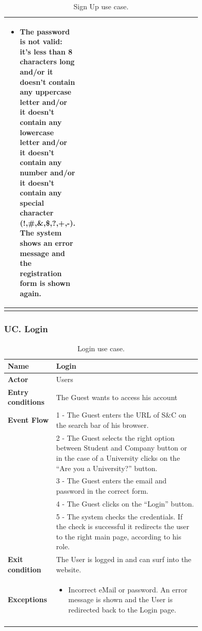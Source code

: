\begin{center}
\begin{longtable}{|l|p{0.75\linewidth}|}
\begin{itemize}
            \item The password is not valid: it’s less than 8 characters long and/or it doesn’t contain any uppercase letter and/or it doesn’t contain any lowercase letter and/or it doesn’t contain any number and/or it doesn’t contain any special character (!,\#,\&,\$,?,+,-). The system shows an error message and the registration form is shown again.
        \end{itemize}\\
        \hline
        \caption{Sign Up use case.}
        \label{tab: sign_up_use_case}
    \end{longtable}
\end{center}


\subsubsection*{UC\cuc . Login}
\begin{center}
    \begin{longtable}{|l|p{0.75\linewidth}|}
        \hline
        \textbf{Name}               & Login\\
        \hline
        \textbf{Actor}              & Users\\
        \hline
        \textbf{Entry conditions}   & The Guest wants to access his account\\
        \hline
        \textbf{Event Flow}         & 1 - The Guest enters the URL of S\&C on the search bar of his browser.    \\
        & 2 - The Guest selects the right option between Student and Company button or in the case of a University clicks on the “Are you a University?” button. \\
        & 3 - The Guest enters the email and password in the correct form. \\
        & 4 - The Guest clicks on the “Login” button. \\
        & 5 - The system checks the credentials. If the check is successful it redirects the user to the right main page, according to his role.  \\
        \hline
        \textbf{Exit condition}   & The User is logged in and can surf into the website. \\       
        \hline
        \textbf{Exceptions}       & \begin{itemize}
            \item Incorrect eMail or password. An error message is shown and the User is redirected back to the Login page.
        \end{itemize}   \\
        \hline
        \caption{Login use case.}
        \label{tab: login_use_case}
    \end{longtable}
\end{center}


